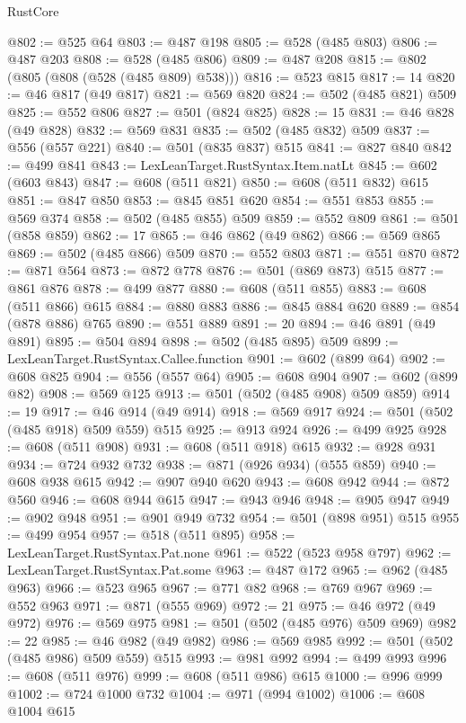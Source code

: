 \begin{lexlean}{RustCore}
\begin{coremodule}
@802 := @525 @64
@803 := @487 @198
@805 := @528 (@485 @803)
@806 := @487 @203
@808 := @528 (@485 @806)
@809 := @487 @208
@815 := @802 (@805 (@808 (@528 (@485 @809) @538)))
@816 := @523 @815
@817 := 14
@820 := @46 @817 (@49 @817)
@821 := @569 @820
@824 := @502 (@485 @821) @509
@825 := @552 @806
@827 := @501 (@824 @825)
@828 := 15
@831 := @46 @828 (@49 @828)
@832 := @569 @831
@835 := @502 (@485 @832) @509
@837 := @556 (@557 @221)
@840 := @501 (@835 @837) @515
@841 := @827 @840
@842 := @499 @841
@843 := LexLeanTarget.RustSyntax.Item.natLt
@845 := @602 (@603 @843)
@847 := @608 (@511 @821)
@850 := @608 (@511 @832) @615
@851 := @847 @850
@853 := @845 @851 @620
@854 := @551 @853
@855 := @569 @374
@858 := @502 (@485 @855) @509
@859 := @552 @809
@861 := @501 (@858 @859)
@862 := 17
@865 := @46 @862 (@49 @862)
@866 := @569 @865
@869 := @502 (@485 @866) @509
@870 := @552 @803
@871 := @551 @870
@872 := @871 @564
@873 := @872 @778
@876 := @501 (@869 @873) @515
@877 := @861 @876
@878 := @499 @877
@880 := @608 (@511 @855)
@883 := @608 (@511 @866) @615
@884 := @880 @883
@886 := @845 @884 @620
@889 := @854 (@878 @886) @765
@890 := @551 @889
@891 := 20
@894 := @46 @891 (@49 @891)
@895 := @504 @894
@898 := @502 (@485 @895) @509
@899 := LexLeanTarget.RustSyntax.Callee.function
@901 := @602 (@899 @64)
@902 := @608 @825
@904 := @556 (@557 @64)
@905 := @608 @904
@907 := @602 (@899 @82)
@908 := @569 @125
@913 := @501 (@502 (@485 @908) @509 @859)
@914 := 19
@917 := @46 @914 (@49 @914)
@918 := @569 @917
@924 := @501 (@502 (@485 @918) @509 @559) @515
@925 := @913 @924
@926 := @499 @925
@928 := @608 (@511 @908)
@931 := @608 (@511 @918) @615
@932 := @928 @931
@934 := @724 @932 @732
@938 := @871 (@926 @934) (@555 @859)
@940 := @608 @938 @615
@942 := @907 @940 @620
@943 := @608 @942
@944 := @872 @560
@946 := @608 @944 @615
@947 := @943 @946
@948 := @905 @947
@949 := @902 @948
@951 := @901 @949 @732
@954 := @501 (@898 @951) @515
@955 := @499 @954
@957 := @518 (@511 @895)
@958 := LexLeanTarget.RustSyntax.Pat.none
@961 := @522 (@523 @958 @797)
@962 := LexLeanTarget.RustSyntax.Pat.some
@963 := @487 @172
@965 := @962 (@485 @963)
@966 := @523 @965
@967 := @771 @82
@968 := @769 @967
@969 := @552 @963
@971 := @871 (@555 @969)
@972 := 21
@975 := @46 @972 (@49 @972)
@976 := @569 @975
@981 := @501 (@502 (@485 @976) @509 @969)
@982 := 22
@985 := @46 @982 (@49 @982)
@986 := @569 @985
@992 := @501 (@502 (@485 @986) @509 @559) @515
@993 := @981 @992
@994 := @499 @993
@996 := @608 (@511 @976)
@999 := @608 (@511 @986) @615
@1000 := @996 @999
@1002 := @724 @1000 @732
@1004 := @971 (@994 @1002)
@1006 := @608 @1004 @615

\end{coremodule}
\end{lexlean}
